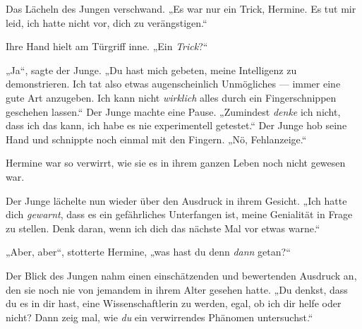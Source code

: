 Das Lächeln des Jungen verschwand.
„Es war nur ein Trick, Hermine. Es tut mir leid, ich hatte nicht vor, dich zu verängstigen.“

Ihre Hand hielt am Türgriff inne.
„Ein \emph{Trick}?“

„Ja“, sagte der Junge.
„Du hast mich gebeten, meine Intelligenz zu demonstrieren. Ich tat also etwas augenscheinlich Unmögliches — immer eine gute Art anzugeben. Ich kann nicht \emph{wirklich} alles durch ein Fingerschnippen geschehen lassen.“ Der Junge machte eine Pause.
„Zumindest \emph{denke} ich nicht, dass ich das kann, ich habe es nie experimentell getestet.“ Der Junge hob seine Hand und schnippte noch einmal mit den Fingern.
„Nö, Fehlanzeige.“

Hermine war so verwirrt, wie sie es in ihrem ganzen Leben noch nicht gewesen war.

Der Junge lächelte nun wieder über den Ausdruck in ihrem Gesicht.
„Ich hatte dich \emph{gewarnt}, dass es ein gefährliches Unterfangen ist, meine Genialität in Frage zu stellen. Denk daran, wenn ich dich das nächste Mal vor etwas warne.“

„Aber, aber“, stotterte Hermine, „was hast du denn \emph{dann} getan?“

Der Blick des Jungen nahm einen einschätzenden und bewertenden Ausdruck an, den sie noch nie von jemandem in ihrem Alter gesehen hatte.
„Du denkst, dass du es in dir hast, eine Wissenschaftlerin zu werden, egal, ob ich dir helfe oder nicht? Dann zeig mal, wie \emph{du} ein verwirrendes Phänomen untersuchst.“

